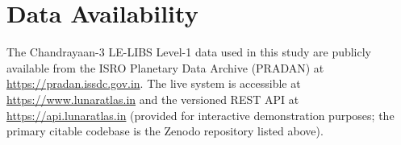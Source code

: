 \documentclass[final,5p,twocolumn,a4paper]{elsarticle}
\begin{document}
\section*{Data Availability}
The Chandrayaan-3 LE-LIBS Level-1 data used in this study are publicly available from the ISRO Planetary Data Archive (PRADAN) at \url{https://pradan.issdc.gov.in}. The live system is accessible at \url{https://www.lunaratlas.in} and the versioned REST API at \url{https://api.lunaratlas.in} (provided for interactive demonstration purposes; the primary citable codebase is the Zenodo repository listed above).



\end{document}
